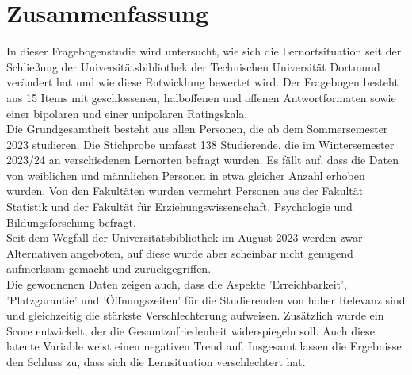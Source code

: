 \documentclass[11pt, a4paper]{article}
\begin{document}
\section*{Zusammenfassung}
In dieser Fragebogenstudie wird untersucht, wie sich die Lernortsituation seit der Schließung der Universitätsbibliothek der Technischen Universität Dortmund verändert hat und wie diese Entwicklung bewertet wird.
Der Fragebogen besteht aus 15 Items mit geschlossenen, halboffenen und offenen Antwortformaten sowie einer bipolaren und einer unipolaren Ratingskala. \\
Die Grundgesamtheit besteht aus allen Personen, die ab dem Sommersemester 2023 studieren. Die Stichprobe umfasst 138 Studierende, die im Wintersemester 2023/24 an verschiedenen Lernorten befragt wurden.
Es fällt auf, dass die Daten von weiblichen und männlichen Personen in etwa gleicher Anzahl erhoben wurden. Von den Fakultäten wurden vermehrt Personen aus der Fakultät Statistik und der Fakultät für Erziehungswissenschaft, Psychologie und Bildungsforschung befragt.\\
Seit dem Wegfall der Universitätsbibliothek im August 2023 werden zwar Alternativen angeboten, auf diese wurde aber scheinbar nicht genügend aufmerksam gemacht und zurückgegriffen.\\
Die gewonnenen Daten zeigen auch, dass die Aspekte 'Erreichbarkeit', 'Platzgarantie' und 'Öffnungszeiten' für die Studierenden von hoher Relevanz sind und gleichzeitig die stärkste Verschlechterung aufweisen. Zusätzlich wurde ein Score entwickelt, der die Gesamtzufriedenheit widerspiegeln soll. Auch diese latente Variable weist einen negativen Trend auf.
Insgesamt lassen die Ergebnisse den Schluss zu, dass sich die Lernsituation verschlechtert hat.\\

\newpage\null\thispagestyle{empty}\newpage

\newpage
\cleardoublepage%
\end{document}
